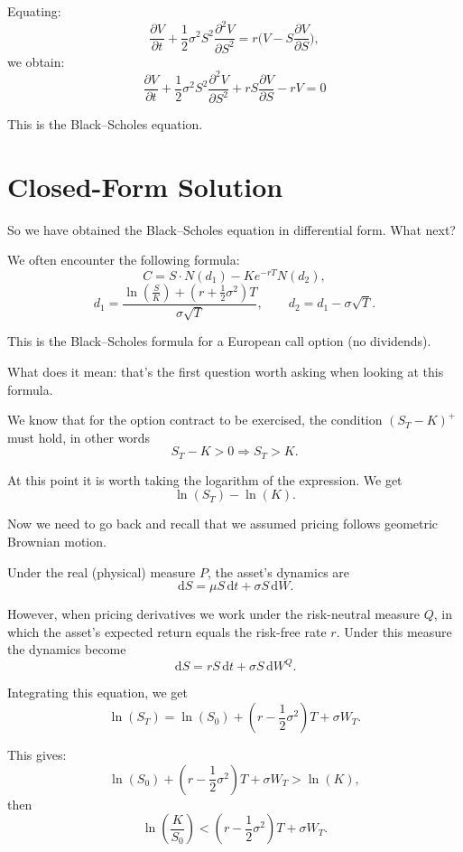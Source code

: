 \documentclass[12pt]{article}
\newcommand{\dd}{\,\mathrm{d}}
\newcommand{\pd}[2]{\frac{\partial #1}{\partial #2}}
\newcommand{\pdd}[2]{\frac{\partial^2 #1}{\partial #2^2}}
\begin{document}
Equating:
\[
\pd{V}{t} + \frac{1}{2}\sigma^2 S^2 \pdd{V}{S}
= r\bigl(V - S\pd{V}{S}\bigr),
\]
we obtain:
\begin{equation}
\boxed{
\pd{V}{t}
+ \frac{1}{2}\sigma^2 S^2 \pdd{V}{S}
+ rS\pd{V}{S}
- rV = 0
}
\end{equation}

This is the Black--Scholes equation.

\section{Closed-Form Solution}

So we have obtained the Black--Scholes equation in differential form.
What next?

We often encounter the following formula:
\[
C = S\cdot N(d_1) - K e^{-rT} N(d_2),
\]
\[
d_1 = \frac{\ln\left(\frac{S}{K}\right) + \left(r + \frac12\sigma^2\right)T}{\sigma\sqrt{T}},
\qquad
d_2 = d_1 - \sigma\sqrt{T}.
\]

This is the Black--Scholes formula for a European call option
(no dividends).

What does it mean: that's the first question worth asking when looking
at this formula.

We know that for the option contract to be exercised, the condition
$(S_T - K)^+$ must hold, in other words
\begin{equation}
S_T - K > 0 \Rightarrow S_T > K.
\end{equation}

At this point it is worth taking the logarithm of the expression.
We get
\[
\ln(S_T) - \ln(K).
\]

Now we need to go back and recall that we assumed pricing follows
geometric Brownian motion.

Under the real (physical) measure $P$, the asset's dynamics are
\[
\dd S = \mu S \dd t + \sigma S \dd W.
\]

However, when pricing derivatives we work under the risk-neutral
measure $Q$, in which the asset's expected return equals the
risk-free rate $r$. Under this measure the dynamics become
\[
\dd S = r S \dd t + \sigma S \dd W^Q.
\]

Integrating this equation, we get
\[
\ln(S_T) = \ln(S_0) + \left(r - \frac12\sigma^2\right)T + \sigma W_T.
\]

This gives:
\[
\ln(S_0) + \left(r - \frac12\sigma^2\right)T + \sigma W_T > \ln(K),
\]
then
\[
\ln\left(\frac{K}{S_0}\right)
<
\left(r - \frac12\sigma^2\right)T + \sigma W_T.
\]
\end{document}
